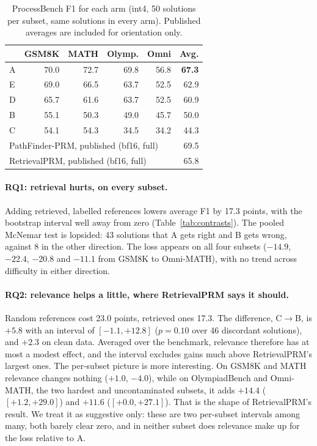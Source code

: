 \documentclass[11pt]{article}
\newcommand{\arm}[1]{\textsc{#1}}
\begin{document}
\begin{table}[t]
\centering
\small
\setlength{\tabcolsep}{4.5pt}
\begin{tabular}{lrrrrr}
\toprule
 & GSM8K & MATH & Olymp. & Omni & Avg. \\
\midrule
\arm{A} & 70.0 & 72.7 & 69.8 & 56.8 & \textbf{67.3} \\
\arm{E} & 69.0 & 66.5 & 63.7 & 52.5 & 62.9 \\
\arm{D} & 65.7 & 61.6 & 63.7 & 52.5 & 60.9 \\
\arm{B} & 55.1 & 50.3 & 49.0 & 45.7 & 50.0 \\
\arm{C} & 54.1 & 54.3 & 34.5 & 34.2 & 44.3 \\
\midrule
\multicolumn{5}{l}{PathFinder-PRM, published (bf16, full)} & 69.5 \\
\multicolumn{5}{l}{RetrievalPRM, published (bf16, full)} & 65.8 \\
\bottomrule
\end{tabular}
\caption{ProcessBench F1 for each arm (int4, 50 solutions per subset, same solutions in every
arm). Published averages are included for orientation only.}
\label{tab:main}
\end{table}

\paragraph{RQ1: retrieval hurts, on every subset.} Adding retrieved, labelled references lowers
average F1 by 17.3 points, with the bootstrap interval well away from zero
(Table~\ref{tab:contrasts}). The pooled McNemar test is lopsided: 43 solutions that \arm{A}
gets right and \arm{B} gets wrong, against 8 in the other direction. The loss appears on all
four subsets ($-14.9$, $-22.4$, $-20.8$ and $-11.1$ from GSM8K to Omni-MATH), with no trend
across difficulty in either direction.

\paragraph{RQ2: relevance helps a little, where RetrievalPRM says it should.} Random references
cost 23.0 points, retrieved ones 17.3. The difference, \arm{C}$\to$\arm{B}, is $+5.8$ with an
interval of $[-1.1, +12.8]$ ($p=0.10$ over 46 discordant solutions), and $+2.3$ on clean data.
Averaged over the benchmark, relevance therefore has at most a modest effect, and the interval
excludes gains much above RetrievalPRM's largest ones. The per-subset picture is more
interesting. On GSM8K and MATH relevance changes nothing ($+1.0$, $-4.0$), while on
OlympiadBench and Omni-MATH, the two hardest and uncontaminated subsets, it adds $+14.4$
($[+1.2, +29.0]$) and $+11.6$ ($[+0.0, +27.1]$). That is the shape of RetrievalPRM's result.
We treat it as suggestive only: these are two per-subset intervals among many, both barely clear
zero, and in neither subset does relevance make up for the loss relative to \arm{A}.
\end{document}
